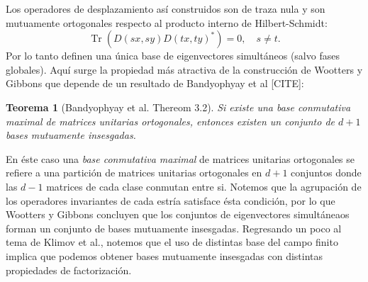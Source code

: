 \documentclass[a4paper]{report}
\DeclareMathOperator{\Tr}{Tr}
\newtheorem{theorem}{Teorema}
\begin{document}
  Los operadores de desplazamiento así construidos son de
  traza nula y son mutuamente ortogonales respecto al
  producto interno de Hilbert-Schmidt:
  \[
    \Tr\left( D(sx,sy) D(tx,ty)^{*} \right) 
    = 0,
    \quad s \neq t.
  \] 
  Por lo tanto definen una única base de eigenvectores
  simultáneos (salvo fases globales). Aquí surge la
  propiedad más atractiva de la construcción de Wootters y
  Gibbons que depende de un resultado de Bandyophyay et al
  [CITE]:
  \begin{theorem}[Bandyophyay et al. Thereom 3.2]
    Si existe una base conmutativa maximal de matrices
    unitarias ortogonales, entonces existen un conjunto de
    $d+1$ bases mutuamente insesgadas.
  \end{theorem}
  En éste caso una \textit{base conmutativa maximal} de
  matrices unitarias ortogonales se refiere a una partición
  de matrices unitarias ortogonales en $d+1$ conjuntos donde
  las $d-1$ matrices de cada clase conmutan entre si.
  Notemos que la agrupación de los operadores invariantes de
  cada estría satisface ésta condición, por lo que Wootters
  y Gibbons concluyen que los conjuntos de eigenvectores
  simultáneaos forman un conjunto de bases mutuamente
  insesgadas. Regresando un poco al tema de Klimov et al.,
  notemos que el uso de distintas base del campo finito
  implica que podemos obtener bases mutuamente insesgadas
  con distintas propiedades de factorización.
\end{document}
